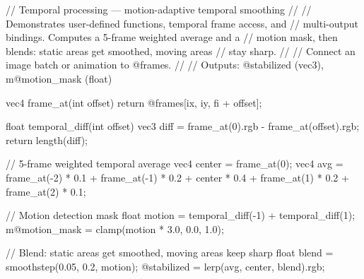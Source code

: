 // Temporal processing — motion-adaptive temporal smoothing
//
// Demonstrates user-defined functions, temporal frame access, and
// multi-output bindings. Computes a 5-frame weighted average and a
// motion mask, then blends: static areas get smoothed, moving areas
// stay sharp.
//
// Connect an image batch or animation to @frames.
//
// Outputs: @stabilized (vec3), m@motion_mask (float)

vec4 frame_at(int offset) {
    return @frames[ix, iy, fi + offset];
}

float temporal_diff(int offset) {
    vec3 diff = frame_at(0).rgb - frame_at(offset).rgb;
    return length(diff);
}

// 5-frame weighted temporal average
vec4 center = frame_at(0);
vec4 avg = frame_at(-2) * 0.1
         + frame_at(-1) * 0.2
         + center * 0.4
         + frame_at(1) * 0.2
         + frame_at(2) * 0.1;

// Motion detection mask
float motion = temporal_diff(-1) + temporal_diff(1);
m@motion_mask = clamp(motion * 3.0, 0.0, 1.0);

// Blend: static areas get smoothed, moving areas keep sharp
float blend = smoothstep(0.05, 0.2, motion);
@stabilized = lerp(avg, center, blend).rgb;